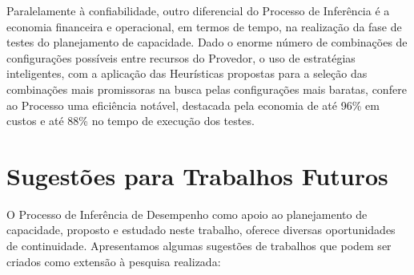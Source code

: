 Paralelamente à confiabilidade, outro diferencial do Processo de Inferência é a 
economia financeira e operacional, em termos de tempo, na realização da fase de 
testes do planejamento de capacidade. Dado o enorme número de combinações de 
configurações possíveis entre recursos do Provedor, o uso de estratégias inteligentes,
com a aplicação das Heurísticas propostas para a seleção das combinações mais 
promissoras na busca pelas configurações mais baratas, confere ao Processo 
uma eficiência notável, destacada pela economia de até 96\% em custos e até 88\% 
no tempo de execução dos testes.  
  
\section{Sugestões para Trabalhos Futuros}
O Processo de Inferência de Desempenho como apoio ao planejamento de capacidade,
proposto e estudado neste trabalho, oferece diversas oportunidades de continuidade. 
Apresentamos algumas sugestões de trabalhos que podem ser criados como extensão 
à pesquisa realizada:

